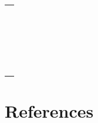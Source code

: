 \documentclass[
  12pt,
  oneside]{report}
\begin{document}
\begin{longtable}[t]{l}
\cite{schipper_contrasting_2016}\\
\cite{schipper_contrasting_2016}\\
\cite{schipper_contrasting_2016}\\
\addlinespace
\cite{schipper_contrasting_2016}\\
\cite{schipper_contrasting_2016}\\
\cite{schipper_contrasting_2016}\\
\cite{schipper_contrasting_2016}\\
\cite{schipper_contrasting_2016}\\
\addlinespace
\cite{schipper_contrasting_2016}\\
\cite{schipper_contrasting_2016}\\
\cite{schipper_contrasting_2016}\\
\cite{schipper_contrasting_2016}\\
\cite{schipper_contrasting_2016}\\
\addlinespace
\cite{schipper_contrasting_2016}\\
\cite{schipper_contrasting_2016}\\
\cite{schipper_contrasting_2016}\\
\cite{schipper_contrasting_2016}\\
\cite{schipper_contrasting_2016}\\
\addlinespace
\cite{schipper_contrasting_2016}\\
\cite{schipper_contrasting_2016}\\*
\end{longtable}
\endgroup{}

\hypertarget{references}{%
\chapter*{References}\label{references}}

\singlespacing


  
\end{document}
